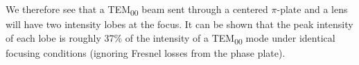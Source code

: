 We therefore see that a TEM\textsubscript{00} beam sent through a centered $\pi$-plate and a lens will have two intensity lobes at the focus. It can be shown that the peak intensity of each lobe is roughly 37\% of the intensity of a TEM\textsubscript{00} mode under identical focusing conditions (ignoring Fresnel losses from the phase plate).
